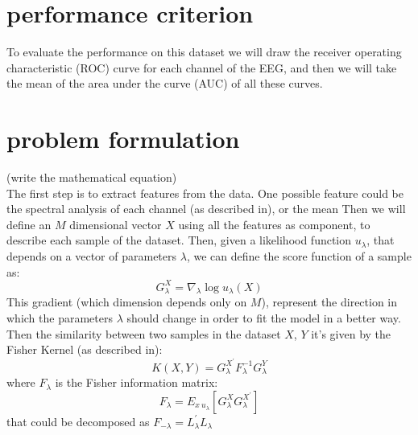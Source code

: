 \documentclass[final,leqno,onefignum,onetabnum]{siamltexmm}
\begin{document}
  \section{performance criterion}
  To evaluate the performance on this dataset we will draw the receiver operating characteristic (ROC) curve for each channel of the EEG, and then we will take the mean of the area under the curve (AUC) of all these curves. 


  \section{problem formulation}
  (write the mathematical equation)\\
  The first step is to extract features from the data. One possible feature could be the spectral analysis of each channel (as described in\cite{features1}), or the mean  Then we will define an $M$ dimensional vector $X$ using all the features as component, to describe each sample of the dataset. Then, given a likelihood function $u_\lambda$, that depends on  a vector of parameters $\lambda$, we can define the score function of a sample as:
  \begin{equation}\label{Glambda}
    G_\lambda^X=\nabla_{\lambda }\log u_\lambda(X)  
  \end{equation}
  This gradient (which dimension depends only on $M$), represent the direction in which the parameters $\lambda$ should change in order to fit the model in a better way.
  Then the similarity between two samples in the dataset $X$, $Y$ it's given by the Fisher Kernel (as described in\cite{fisher}):
  \begin{equation}
    K(X,Y)=G_\lambda^{X^{'}}F_\lambda^{-1} G_\lambda^Y
  \end{equation} 
  where $F_\lambda$ is the Fisher information matrix:
  \begin{equation}
    F_\lambda=E_{x~u_\lambda}[ G_\lambda^XG_\lambda^{X^{'}}]
  \end{equation} 
  that could be decomposed as $F_{-\lambda}=L_\lambda^{'}L_\lambda$


\end{document}
